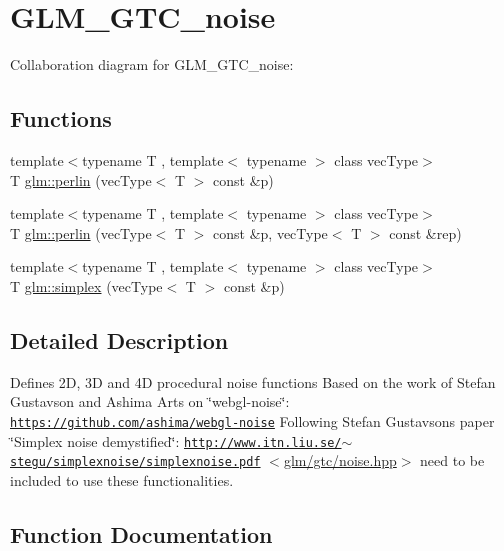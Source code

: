 \hypertarget{group__gtc__noise}{}\section{G\+L\+M\+\_\+\+G\+T\+C\+\_\+noise}
\label{group__gtc__noise}
Collaboration diagram for G\+L\+M\+\_\+\+G\+T\+C\+\_\+noise\+:
\subsection*{Functions}
\begin{DoxyCompactItemize}
\item 
{\footnotesize template$<$typename T , template$<$ typename $>$ class vec\+Type$>$ }\\T \hyperlink{group__gtc__noise_gaa9f3e905afe771551512322edcec001b}{glm\+::perlin} (vec\+Type$<$ T $>$ const \&p)
\item 
{\footnotesize template$<$typename T , template$<$ typename $>$ class vec\+Type$>$ }\\T \hyperlink{group__gtc__noise_ga52495e641513a2f965178d2a5d803077}{glm\+::perlin} (vec\+Type$<$ T $>$ const \&p, vec\+Type$<$ T $>$ const \&rep)
\item 
{\footnotesize template$<$typename T , template$<$ typename $>$ class vec\+Type$>$ }\\T \hyperlink{group__gtc__noise_ga5fa44c45d9b0cf67559b705c95b5dcd7}{glm\+::simplex} (vec\+Type$<$ T $>$ const \&p)
\end{DoxyCompactItemize}


\subsection{Detailed Description}
Defines 2\+D, 3\+D and 4\+D procedural noise functions Based on the work of Stefan Gustavson and Ashima Arts on \char`\"{}webgl-\/noise\char`\"{}\+: \href{https://github.com/ashima/webgl-noise}{\tt https\+://github.\+com/ashima/webgl-\/noise} Following Stefan Gustavson\textquotesingle{}s paper \char`\"{}\+Simplex noise demystified\char`\"{}\+: \href{http://www.itn.liu.se/~stegu/simplexnoise/simplexnoise.pdf}{\tt http\+://www.\+itn.\+liu.\+se/$\sim$stegu/simplexnoise/simplexnoise.\+pdf} $<$\hyperlink{gtc_2noise_8hpp}{glm/gtc/noise.\+hpp}$>$ need to be included to use these functionalities. 

\subsection{Function Documentation}
\hypertarget{group__gtc__noise_gaa9f3e905afe771551512322edcec001b}{}
